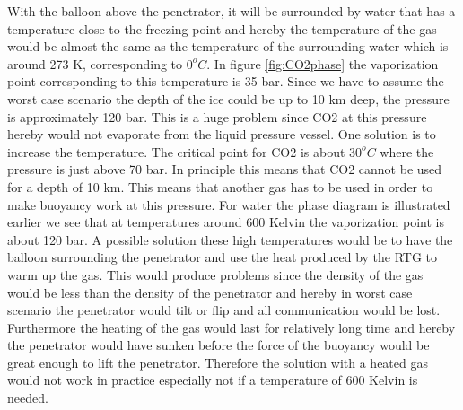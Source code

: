 With the balloon above the penetrator, it will be surrounded by water that has a temperature close to the freezing point and hereby the temperature of the gas would be almost the same as the temperature of the surrounding water which is around 273 K, corresponding to $0^oC$. In figure \ref{fig:CO2phase} the vaporization point corresponding to this temperature is 35 bar. Since we have to assume the worst case scenario the depth of the ice could be up to 10 km deep, the pressure is approximately 120 bar. This is a huge problem since CO2 at this pressure hereby would not evaporate from the liquid pressure vessel. One solution is to increase the temperature. The critical point for CO2 is about $30^oC$ where the pressure is just above 70 bar. In principle this means that CO2 cannot be  used for a depth of 10 km. This means that another gas has to be used in order to make buoyancy work at this pressure. For water the phase diagram is illustrated earlier we see that at temperatures around 600 Kelvin the vaporization point is about 120 bar. A possible solution these high temperatures would be to have the balloon surrounding the penetrator and use the heat produced by the RTG to warm up the gas. This would produce problems since the density of the gas would be less than the density of the penetrator and hereby in worst case scenario the penetrator would tilt or flip and all communication would be lost. Furthermore the heating of the gas would last for relatively long time and hereby the penetrator would have sunken before the force of the buoyancy would be great enough to lift the penetrator. Therefore the solution with a heated gas would not work in practice especially not if a temperature of 600 Kelvin is needed.\\
 
